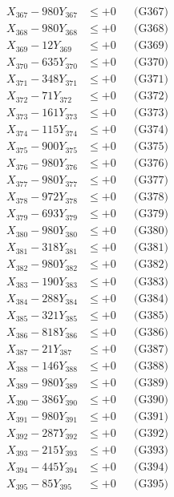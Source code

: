 \documentclass[a4paper,10pt]{article}
\begin{document}
{\begin{align}
X_{367} - 980Y_{367} &\leq +0 && \text{(G367)} \\
X_{368} - 980Y_{368} &\leq +0 && \text{(G368)} \\
X_{369} - 12Y_{369} &\leq +0 && \text{(G369)} \\
X_{370} - 635Y_{370} &\leq +0 && \text{(G370)} \\
\allowbreak
X_{371} - 348Y_{371} &\leq +0 && \text{(G371)} \\
X_{372} - 71Y_{372} &\leq +0 && \text{(G372)} \\
X_{373} - 161Y_{373} &\leq +0 && \text{(G373)} \\
X_{374} - 115Y_{374} &\leq +0 && \text{(G374)} \\
X_{375} - 900Y_{375} &\leq +0 && \text{(G375)} \\
X_{376} - 980Y_{376} &\leq +0 && \text{(G376)} \\
X_{377} - 980Y_{377} &\leq +0 && \text{(G377)} \\
X_{378} - 972Y_{378} &\leq +0 && \text{(G378)} \\
X_{379} - 693Y_{379} &\leq +0 && \text{(G379)} \\
X_{380} - 980Y_{380} &\leq +0 && \text{(G380)} \\
\allowbreak
X_{381} - 318Y_{381} &\leq +0 && \text{(G381)} \\
X_{382} - 980Y_{382} &\leq +0 && \text{(G382)} \\
X_{383} - 190Y_{383} &\leq +0 && \text{(G383)} \\
X_{384} - 288Y_{384} &\leq +0 && \text{(G384)} \\
X_{385} - 321Y_{385} &\leq +0 && \text{(G385)} \\
X_{386} - 818Y_{386} &\leq +0 && \text{(G386)} \\
X_{387} - 21Y_{387} &\leq +0 && \text{(G387)} \\
X_{388} - 146Y_{388} &\leq +0 && \text{(G388)} \\
X_{389} - 980Y_{389} &\leq +0 && \text{(G389)} \\
X_{390} - 386Y_{390} &\leq +0 && \text{(G390)} \\
\allowbreak
X_{391} - 980Y_{391} &\leq +0 && \text{(G391)} \\
X_{392} - 287Y_{392} &\leq +0 && \text{(G392)} \\
X_{393} - 215Y_{393} &\leq +0 && \text{(G393)} \\
X_{394} - 445Y_{394} &\leq +0 && \text{(G394)} \\
X_{395} - 85Y_{395} &\leq +0 && \text{(G395)} \\

\end{align}}
\end{document}
